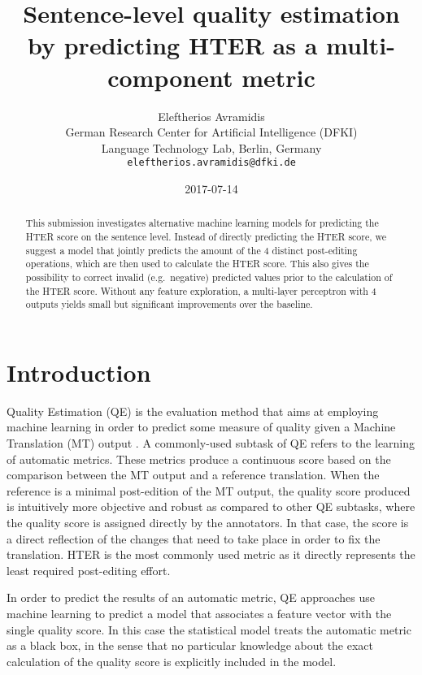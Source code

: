 \documentclass[11pt,letterpaper]{article}
\title{Sentence-level quality estimation by predicting HTER as a multi-component
metric}
\author{Eleftherios Avramidis \\
	German Research Center for Artificial Intelligence (DFKI) \\
	Language Technology Lab, Berlin, Germany \\
  {\tt eleftherios.avramidis@dfki.de}}
\date{2017-07-14}
\begin{document}
\maketitle 


\begin{abstract}
This submission investigates alternative machine learning models for predicting
the HTER score on the sentence level. Instead of directly predicting the HTER
score, we suggest a model that jointly predicts the amount of the 4 distinct
post-editing operations, which are then used to calculate the HTER score. This
also gives the possibility to correct invalid (e.g.~negative) predicted values
prior to the calculation of the HTER score. Without any feature exploration, a
multi-layer perceptron with 4 outputs yields small but significant improvements
over the baseline.
\end{abstract}


\section{Introduction}

Quality Estimation (QE) is the evaluation method that aims at employing machine
learning in order to predict some measure of quality given a Machine Translation
(MT) output \cite{Blatz:2004:CEM:1220355.1220401}. A commonly-used subtask of QE
refers to the learning of automatic metrics. These metrics produce a continuous
score based on the comparison between the MT output and a reference translation.
When the reference is a minimal post-edition of the MT output, the quality score
produced is intuitively more objective and robust as compared to other QE
subtasks, where the quality score is assigned directly by the annotators. In
that case, the score is a direct reflection of the changes that need to take
place in order to fix the translation. HTER
\cite{Snover:2009:FAH:1626431.1626480} is the most commonly used metric as it
directly represents the least required post-editing effort.

In order to predict the results of an automatic metric, QE approaches use
machine learning to predict a model that associates a feature vector with the
single quality score. In this case the statistical model treats the automatic
metric as a black box, in the sense that no particular knowledge about the exact
calculation of the quality score is explicitly included in the model.
\end{document}
